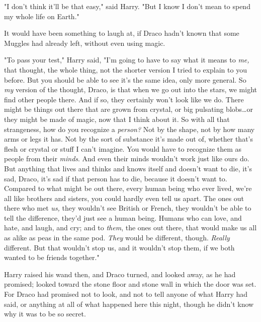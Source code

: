 "I don’t think it’ll be that easy," said Harry. "But I know I don’t mean to
spend my whole life on Earth."

It would have been something to laugh at, if Draco hadn’t known that some
Muggles had already left, without even using magic.

"To pass your test," Harry said, "I’m going to have to say what it means to
\emph{me,} that thought, the whole thing, not the shorter version I tried to
explain to you before. But you should be able to see it’s the same idea, only
more general. So \emph{my} version of the thought, Draco, is that when we go
out into the stars, we might find other people there. And if so, they certainly
won’t look like we do. There might be things out there that are grown from
crystal, or big pulsating blobs…or they might be made of magic, now
that I think about it. So with all that strangeness, how do you recognize a
\emph{person?} Not by the shape, not by how many arms or legs it has. Not by
the sort of substance it’s made out of, whether that’s flesh or crystal or
stuff I can’t imagine. You would have to recognize them as people from their
\emph{minds}. And even their minds wouldn’t work just like ours do. But
anything that lives and thinks and knows itself and doesn’t want to die, it’s
sad, Draco, it’s sad if that person has to die, because it doesn’t want to.
Compared to what might be out there, every human being who ever lived, we’re
all like brothers and sisters, you could hardly even tell us apart. The ones
out there who met \emph{us,} they wouldn’t see British or French, they wouldn’t
be able to tell the difference, they’d just see a human being. Humans who can
love, and hate, and laugh, and cry; and to \emph{them}, the ones out there,
that would make us all as alike as peas in the same pod. \emph{They} would be
different, though. \emph{Really} different. But that wouldn’t stop us, and it
wouldn’t stop them, if we both wanted to be friends together."

Harry raised his wand then, and Draco turned, and looked away, as he had
promised; looked toward the stone floor and stone wall in which the door was
set. For Draco had promised not to look, and not to tell anyone of what Harry
had said, or anything at all of what happened here this night, though he didn’t
know why it was to be so secret.

